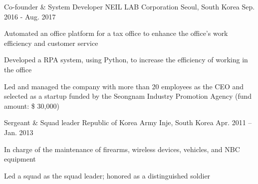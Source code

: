 


\begin{cventries}


\cventry
{Co-founder \& System Developer} %
{NEIL LAB Corporation} %
{Seoul, South Korea} %
{Sep. 2016 - Aug. 2017} %
{ %
\begin{cvitems}
\item {Automated an office platform for a tax office to enhance the office’s work efficiency and customer service}
\item {Developed a RPA system, using Python, to increase the efficiency of working in the office}
\item {Led and managed the company with more than 20 employees as the CEO and selected as a startup funded by the Seongnam Industry Promotion Agency (fund amount: \$ 30,000)}
\end{cvitems}
}


\cventry
{Sergeant \& Squad leader} %
{Republic of Korea Army} %
{Inje, South Korea} %
{Apr. 2011 – Jan. 2013} %
{ %
\begin{cvitems}
\item {In charge of the maintenance of firearms, wireless devices, vehicles, and NBC equipment}
\item {Led a squad as the squad leader; honored as a distinguished soldier}
\end{cvitems}
}



\end{cventries}